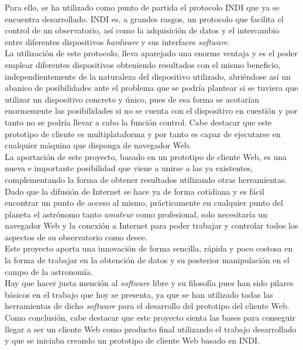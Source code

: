 Para ello, se ha utilizado como punto de partida el protocolo INDI que ya se encuentra desarrollado. INDI es, a grandes rasgos, un protocolo que facilita el control de un observatorio, así como la adquisición de datos y el intercambio entre diferentes dispositivos \textit{hardware} y sus interfaces \textit{software}.\\

La utilización de este protocolo, lleva aparejado una enorme ventaja y es el poder emplear diferentes dispositivos obteniendo resultados con el mismo beneficio, independientemente de la naturaleza del dispositivo utilizado, abriéndose así un abanico de posibilidades ante el problema que se podría plantear si se tuviera que utilizar un dispositivo concreto y único, pues de esa forma se acotarían enormemente las posibilidades si no se cuenta con el dispositivo en cuestión y por tanto no se podría llevar a cabo la función control. Cabe destacar que este prototipo de cliente es multiplataforma y por tanto es capaz de ejecutarse en cualquier máquina que disponga de navegador Web.\\

La aportación de este proyecto, basado en un prototipo de cliente Web, es una nueva e importante posibilidad  que viene a unirse a las ya existentes, complementando la forma de obtener resultados utilizando otras herramientas. \\

Dado que la difusión de Internet se hace ya de forma cotidiana y es fácil encontrar un punto de acceso al mismo, prácticamente en cualquier punto del planeta el astrónomo tanto \textit{amateur} como  profesional, solo necesitaría un navegador Web y la conexión a Internet para poder trabajar y controlar todos los aspectos de su observatorio como desee.\\

Este proyecto aporta una innovación de forma sencilla, rápida y poco costosa en la forma de trabajar en la obtención de datos y su posterior manipulación en el campo de la astronomía.\\

Hay que hacer justa mención al \textit{software} libre y su filosofía pues han sido pilares básicos en el trabajo que hoy se presenta, ya que se han utilizado todas las herramientas de dicho \textit{software} para el desarrollo del prototipo del cliente Web.\\

Como conclusión, cabe destacar que este proyecto sienta las bases para conseguir llegar a ser un cliente Web como producto final utilizando el trabajo desarrollado y que se iniciaba creando un prototipo de cliente Web basado en INDI. \\


